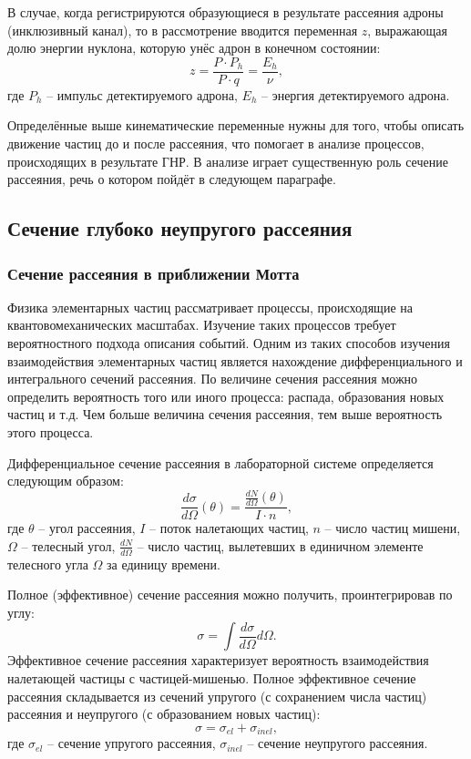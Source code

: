 \documentclass{extarticle}
\begin{document}
В случае, когда регистрируются образующиеся в результате рассеяния адроны (инклюзивный канал), то в рассмотрение вводится переменная $z$, выражающая долю энергии нуклона, которую унёс адрон в конечном состоянии:
\begin{equation}
	\label{eq:z}
	z = \frac{P \cdot P_h}{P \cdot q} = \frac{E_h}{\nu},
\end{equation}
где $P_h$ -- импульс детектируемого адрона, $E_h$ -- энергия детектируемого адрона. 

Определённые выше кинематические переменные нужны для того, чтобы описать движение частиц до и после рассеяния, что помогает в анализе процессов, происходящих в результате ГНР. В анализе играет существенную роль сечение рассеяния, речь о котором пойдёт в следующем параграфе.
\subsection{Сечение глубоко неупругого рассеяния}
\subsubsection{Сечение рассеяния в приближении Мотта}
Физика элементарных частиц рассматривает процессы, происходящие на квантовомеханических масштабах. Изучение таких процессов требует вероятностного подхода описания событий. Одним из таких способов изучения взаимодействия элементарных частиц является нахождение дифференциального и интегрального сечений рассеяния. По величине сечения рассеяния можно определить вероятность того или иного процесса: распада, образования новых частиц и т.д. Чем больше величина сечения рассеяния, тем выше вероятность этого процесса.

Дифференциальное сечение рассеяния в лабораторной системе определяется следующим образом:
\begin{equation}
    \frac{d\sigma}{d\Omega}(\theta) = \frac{\frac{dN}{d\Omega}(\theta)}{I \cdot n},
\end{equation}
где $\theta$ -- угол рассеяния, $I$ -- поток налетающих частиц, $n$ -- число частиц мишени, $\Omega$ -- телесный угол, $\frac{dN}{d\Omega}$ -- число частиц, вылетевших в единичном элементе телесного угла $\Omega$ за единицу времени.

Полное (эффективное) сечение рассеяния можно получить, проинтегрировав по углу:
\begin{equation}
    \sigma = \int \frac{d\sigma}{d\Omega}d\Omega. 
\end{equation}
Эффективное сечение рассеяния характеризует вероятность взаимодействия налетающей частицы с частицей-мишенью. Полное эффективное сечение рассеяния складывается из сечений упругого (с сохранением числа частиц) рассеяния и неупругого (с образованием новых частиц):
\begin{equation}
    \sigma = \sigma_{el} + \sigma_{inel},
\end{equation}
где $\sigma_{el}$ -- сечение упругого рассеяния, $\sigma_{inel}$ -- сечение неупругого рассеяния. 
\end{document}
